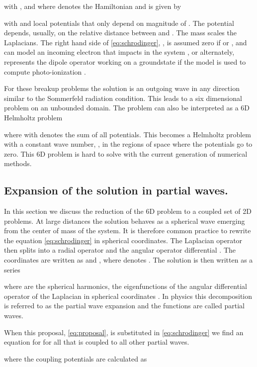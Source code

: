 \documentclass[mathpazo]{cicp}
\theoremstyle{definition}
\numberwithin{equation}{section}
\providecommand{\wv}{}
\providecommand{\hbz}{}
\begin{document}
\wv{with , } and where  denotes the Hamiltonian and is given by

with  and  local potentials that only depend on magnitude of
. The potential  depends, \wv{usually,} on the relative
distance between  and . \wv{The mass  scales the Laplacians.} The right hand
side of \eqref{eq:schrodinger}, \wv{,
 is assumed zero if  or ,} and can
model an incoming electron that impacts in the system \cite{rescigno1999}, \hbz{or alternately, represents the dipole operator working on a groundstate if the model is used to compute photo-ionization \cite{Wim05}}. 

For these breakup problems the solution
 is  an outgoing wave in any
direction similar to the Sommerfeld radiation condition.  This leads to a six dimensional problem on an unbounded
domain.  The problem can also be interpreted as a 6D Helmholtz problem

where  with 
denotes the sum of all potentials.  This becomes a Helmholtz problem
with a constant wave number, , in the regions of space
where the potentials go to zero. This  6D problem is hard to solve with the current generation of numerical methods.

\subsection{Expansion of the solution in partial waves.}
In this section we discuss the reduction of the 6D problem to a
coupled set of 2D problems.  At large distances \hbz{the} solution behaves as
a spherical \hbz{wave} emerging from the center of mass of the system.  It
is therefore common practice \cite{baertschy2001,vanroose2006double}
to rewrite the equation \eqref{eq:schrodinger} in spherical
coordinates.  \wv{The Laplacian operator then splits into a radial
operator and the angular operator differential  \cite{arfken}.}  The coordinates are
written as  and , where  denotes .
\wv{The solution is then written} as a series

where  are the spherical harmonics, \wv{the
  eigenfunctions of the angular differential operator of the Laplacian
  in spherical coordinates \cite{arfken}.  In physics this decomposition is referred
  to as the partial wave expansion and the functions
   are called partial waves.}

When this proposal, \eqref{eq:proposal}, is \hbz{substituted} in \eqref{eq:schrodinger} we find
an equation for  for all
 that is
coupled to all other partial waves.

where the coupling potentials are calculated as
\end{document}
